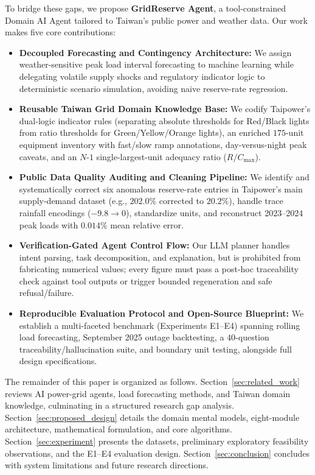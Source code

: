 \documentclass[conference]{IEEEtran}
\begin{document}
To bridge these gaps, we propose \textbf{GridReserve Agent}, a tool-constrained Domain AI Agent tailored to Taiwan's public power and weather data. Our work makes five core contributions:
\begin{itemize}
    \item \textbf{Decoupled Forecasting and Contingency Architecture:} We assign weather-sensitive peak load interval forecasting to machine learning while delegating volatile supply shocks and regulatory indicator logic to deterministic scenario simulation, avoiding naive reserve-rate regression.
    \item \textbf{Reusable Taiwan Grid Domain Knowledge Base:} We codify Taipower's dual-logic indicator rules (separating absolute thresholds for Red/Black lights from ratio thresholds for Green/Yellow/Orange lights), an enriched $175$-unit equipment inventory with fast/slow ramp annotations, day-versus-night peak caveats, and an $N\text{-}1$ single-largest-unit adequacy ratio ($R / C_{\max}$).
    \item \textbf{Public Data Quality Auditing and Cleaning Pipeline:} We identify and systematically correct six anomalous reserve-rate entries in Taipower's main supply-demand dataset (e.g., $202.0\%$ corrected to $20.2\%$), handle trace rainfall encodings ($-9.8 \rightarrow 0$), standardize units, and reconstruct 2023--2024 peak loads with $0.014\%$ mean relative error.
    \item \textbf{Verification-Gated Agent Control Flow:} Our LLM planner handles intent parsing, task decomposition, and explanation, but is prohibited from fabricating numerical values; every figure must pass a post-hoc traceability check against tool outputs or trigger bounded regeneration and safe refusal/failure.
    \item \textbf{Reproducible Evaluation Protocol and Open-Source Blueprint:} We establish a multi-faceted benchmark (Experiments E1--E4) spanning rolling load forecasting, September 2025 outage backtesting, a $40$-question traceability/hallucination suite, and boundary unit testing, alongside full design specifications.
\end{itemize}

The remainder of this paper is organized as follows. Section~\ref{sec:related_work} reviews AI power-grid agents, load forecasting methods, and Taiwan domain knowledge, culminating in a structured research gap analysis. Section~\ref{sec:proposed_design} details the domain mental models, eight-module architecture, mathematical formulation, and core algorithms. Section~\ref{sec:experiment} presents the datasets, preliminary exploratory feasibility observations, and the E1--E4 evaluation design. Section~\ref{sec:conclusion} concludes with system limitations and future research directions.
\end{document}
